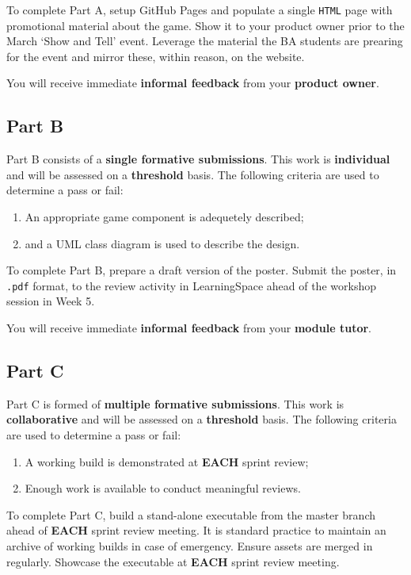 \documentclass{../../fal_assignment}
\begin{document}
To complete Part A, setup GitHub Pages and populate a single \texttt{HTML} page with promotional material about the game. Show it to your product owner prior to the March `Show and Tell' event. Leverage the material the BA students are prearing for the event and mirror these, within reason, on the website.

You will receive immediate \textbf{informal feedback} from your \textbf{product owner}.

\subsection*{Part B}

Part B consists of a \textbf{single formative submissions}. This work is \textbf{individual} and will be assessed on a \textbf{threshold} basis. The following criteria are used to determine a pass or fail:

\begin{enumerate}[label=(\alph*)]
	\item An appropriate game component is adequetely described;
	\item and a UML class diagram is used to describe the design.
\end{enumerate}

To complete Part B, prepare a draft version of the poster. Submit the poster, in \texttt{.pdf} format, to the review activity in LearningSpace ahead of the workshop session in Week 5.

You will receive immediate \textbf{informal feedback} from your \textbf{module tutor}.

\subsection*{Part C}

Part C is formed of \textbf{multiple formative submissions}. This work is \textbf{collaborative} and will be assessed on a \textbf{threshold} basis. The following criteria are used to determine a pass or fail:

\begin{enumerate}[label=(\alph*)]
	\item A working build is demonstrated at \textbf{EACH} sprint review;
	\item Enough work is available to conduct meaningful reviews.
\end{enumerate}

To complete Part C, build a stand-alone executable from the master branch ahead of \textbf{EACH} sprint review meeting. It is standard practice to maintain an archive of working builds in case of emergency. Ensure assets are merged in regularly. Showcase the executable at \textbf{EACH} sprint review meeting.
\end{document}

